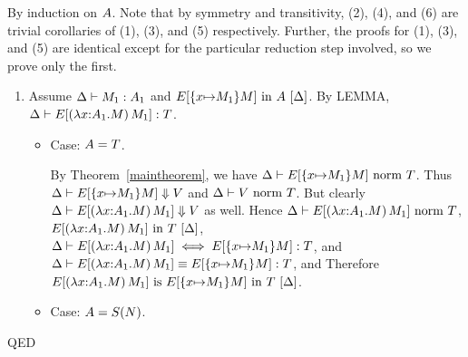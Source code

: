 \documentclass{article}
\theoremstyle{break}
\newcommand{\qed}{\mbox{QED}}
\newenvironment{proof}{\noindent{\bf Proof:}\hspace*{0.5em}}{\hspace*{\fill}\qed}
\begin{document}
\begin{proof}
By induction on $A$.  Note that by symmetry and transitivity, (2),
(4), and (6) are trivial corollaries of (1), (3), and (5)
respectively.  Further, the proofs for (1), (3), and (5) are identical
except for the particular reduction step involved, so we prove only the first.

\begin{enumerate}
\item
Assume $\Delta\vdash M_1 : A_1$ and
${E[\{x{\mapsto}M_1\}{M}]}\mathrm{\ in\ }{A}\ [\Delta]$.
By LEMMA, 
$\Delta\vdash E[(\lambda x{:}A_1.M)\,M_1] : T$.

\newcommand{\redex}{\capply{(\cfunction{\cvar}{\kind_1}{\constructor})}{\constructor_1}}
\newcommand{\reduct}{\substitute{\cvar}{\constructor_1}{\constructor}}

\begin{itemize}
\item Case: $A = T$.  

By Theorem~\ref{maintheorem}, we have
${\Delta}\vdash{E[\{x{\mapsto}M_1\}{M}]}\mbox{\ norm\ }{T}$.
Thus $\Delta\vdash E[\{x{\mapsto}M_1\}{M}] \Downarrow V$
and ${\Delta}\vdash{V}\mbox{\ norm\ }{T}$.
But clearly 
$\Delta\vdash E[(\lambda x{:}A_1.M)\,M_1] \Downarrow V$
as well.  Hence
${\Delta}\vdash{E[(\lambda x{:}A_1.M)\,M_1]}\mbox{\ norm\ }{T}$,
${E[(\lambda x{:}A_1.M)\,M_1]}\mathrm{\ in\ }{T}\ [\Delta]$,
$\Delta\vdash E[(\lambda x{:}A_1.M)\,M_1] \iff E[\{x{\mapsto}M_1\}{M}] : T$, and
$\Delta\vdash E[(\lambda x{:}A_1.M)\,M_1] \equiv E[\{x{\mapsto}M_1\}{M}] : T$, and
Therefore
${E[(\lambda x{:}A_1.M)\,M_1]}\mathrm{\ is\ }{E[\{x{\mapsto}M_1\}{M}]}\mathrm{\ in\ }{T}\ [\Delta]$.

\item Case: $A=S(N)$.


\end{itemize}
\end{enumerate}
\end{proof}
\end{document}
